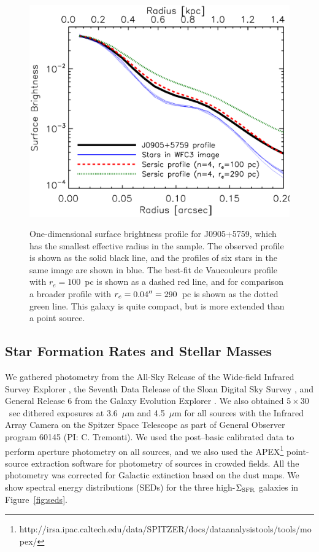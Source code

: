 \documentclass[apj]{emulateapj}
\newcommand{\sigmasfr}{\Sigma_{\textnormal{\scriptsize{SFR}}}}
\begin{document}
\begin{figure}[!t]
\includegraphics[angle=0,scale=0.41]{profile.ps}
\label{fig:profile}
\caption{One-dimensional surface brightness profile for J0905+5759,
  which has the smallest effective radius in the sample.  The observed
  profile is shown as the solid black line, and the profiles of six
  stars in the same image are shown in blue.  The best-fit de
  Vaucouleurs profile with $r_e=100$~pc is shown as a dashed red line,
  and for comparison a broader profile with $r_e=0.04\mbox{$^{\prime\prime}$}=290$~pc
  is shown as the dotted green line.  This galaxy is quite compact,
  but is more extended than a point source.}
\end{figure}



\subsection{Star Formation Rates and Stellar Masses}

We gathered photometry from the All-Sky Release of the Wide-field
Infrared Survey Explorer \citep[WISE,][]{wri10}, the Seventh Data
Release of the Sloan Digital Sky Survey \citep[SDSS,][]{aba09}, and
General Release 6 from the Galaxy Evolution Explorer
\citep[GALEX,][]{mar05galex}.  We also obtained $5\times30$~sec
dithered exposures at 3.6~$\mu$m and 4.5~$\mu$m for all sources with
the Infrared Array Camera \citep{faz04} on the Spitzer Space Telescope
\citep{wer04} as part of General Observer program 60145 (PI:
C. Tremonti).  We used the post--basic calibrated data to perform
aperture photometry on all sources, and we also used the
APEX\footnote{http://irsa.ipac.caltech.edu/data/SPITZER/docs/dataanalysistools/tools/mopex/}
point-source extraction software for photometry of sources in crowded
fields.  All the photometry was corrected for Galactic extinction
based on the \citet{sch98} dust maps.  We show spectral energy
distributions (SEDs) for the three high-$\sigmasfr$ galaxies in
Figure~\ref{fig:seds}.
\end{document}
